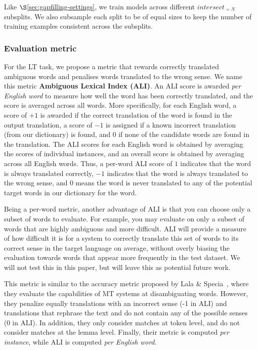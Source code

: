 \documentclass[twocolumn]{svjour3}          \smartqed  \usepackage{graphicx}
\begin{document}
Like $\S$\ref{sec:gapfilling-settings}, we train models across different $intersect_{=N}$ subsplits. We also subsample each split to be of equal sizes to keep the number of training examples consistent across the subsplits.







\subsubsection{Evaluation metric}
\label{sec:mlt-metric}
For the LT task, we propose a metric that rewards correctly translated ambiguous words and penalises words translated to the wrong sense. We name this metric \textbf{Ambiguous Lexical Index (ALI)}. An ALI score is awarded \emph{per English word} to measure how well the word has been correctly translated, 
and the score is averaged across all words. More specifically, for each English word, a score of $+1$ is awarded if the correct translation of the word is found in the output translation, a score of $-1$ is assigned if a known incorrect translation (from our dictionary) is found, and $0$ if none of the candidate words are found in the translation. The ALI scores for each English word is obtained by averaging the scores of individual instances, and an overall score is obtained by averaging across all English words. Thus, a per-word ALI score of $1$ indicates that the word is always translated correctly, $-1$ indicates that the word is always translated to the wrong sense, and $0$ means the word is never translated to any of the potential target words in our dictionary for the word. 

Being a per-word metric, another advantage of ALI is that you can choose only a subset of words to evaluate. For example, you may evaluate on only a subset of words that are highly ambiguous and more difficult. ALI will provide a measure of how difficult it is for a system to correctly translate this set of words to its correct sense in the target language on average, without overly biasing the evaluation towards words that appear more frequently in the test dataset. We will not test this in this paper, but will leave this as potential future work.

This metric is similar to the accuracy metric proposed by Lala \& Specia~\cite{LalaSpecia:2018}, where they evaluate the capabilities of MT systems at disambiguating words. However, they penalize equally translations with an incorrect sense (-1 in ALI) and translations that rephrase the text and do not contain any of the possible senses (0 in ALI). In addition, they only consider matches at token level, and do not consider matches at the lemma level. Finally, their metric is computed \emph{per instance}, while ALI is computed \emph{per English word}. 
\end{document}
